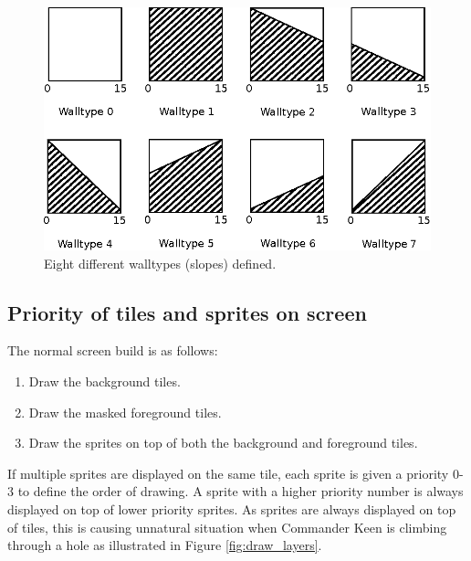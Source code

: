 \documentclass[book.tex]{subfiles}
\begin{document}
\begin{minipage}{\textwidth}
  
\end{minipage}
\label{wallclip_array}
\par
\begin{figure}[H]
  \centering
  \includegraphics[width=\textwidth]{imgs/drawings/walltype.eps}
  \caption{Eight different walltypes (slopes) defined.}
  \label{fig:walltype}
\end{figure}



\par
\begin{minipage}{\textwidth}
  
\end{minipage}
\label{wallclip_array}
\par

\subsection{Priority of tiles and sprites on screen}
The normal screen build is as follows:
\begin{enumerate}
  \item Draw the background tiles.
  \item Draw the masked foreground tiles.
  \item Draw the sprites on top of both the background and foreground tiles.
\end{enumerate}

If multiple sprites are displayed on the same tile, each sprite is given a priority 0-3 to define the order of drawing. A sprite with a higher priority number is always displayed on top of lower priority sprites. As sprites are always displayed on top of tiles, this is causing unnatural situation when Commander Keen is climbing through a  hole as illustrated in Figure \ref{fig:draw_layers}.\\
\end{document}
